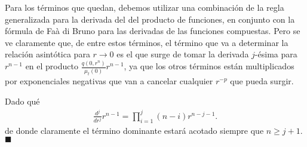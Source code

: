 Para los términos que quedan, debemos utilizar una combinación de la regla generalizada 
para la derivada del 
del producto de funciones, en conjunto con la fórmula de Faà di Bruno 
para las derivadas de las funciones compuestas. Pero se ve claramente que, de entre estos términos, el término 
que va a determinar la relación asintótica para $r \to 0$ es el que surge de 
tomar la derivada $j$-ésima para $r^{n-1}$ en el producto $\frac{q(0,r^n)}{\mu_t(0)}r^{n-1}$, ya que los otros términos están multiplicados por exponenciales negativas 
que van a cancelar cualquier $r^{-p}$ que pueda surgir. 

Dado qué 
\begin{equation}
\begin{split}
\frac{d^j }{dr^j} r^{n-1}= \prod_{i=1}^j (n-i)r^{n-j-1}.
\end{split}
\label{eq:derivadasj3}
\end{equation}
de donde claramente el término dominante estará acotado siempre que 
$n\ge j+1$. $\blacksquare$

\pagestyle{empty}

